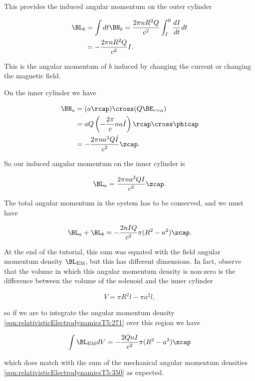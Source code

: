 This provides the induced angular momentum on the outer cylinder

\begin{align*}
\BL_b
&= \int dt \BN_b = \frac{ 2 \pi n R^2 Q}{c^2} \int_I^0 \frac{dI}{dt} dt \\
&= -\frac{2 \pi n R^2 Q}{c^2} I.
\end{align*}

This is the angular momentum of $b$ induced by changing the current or changing the magnetic field.

On the inner cylinder we have

\begin{align*}
\BN_a
&= (a \rcap ) \cross (Q \BE_{r = a}) \\
&= a Q \left(- \frac{2 \pi}{c} n a \dot{I} \right) \rcap \cross \phicap \\
&= -\frac{2 \pi n a^2 Q \dot{I}}{c^2} \zcap.
\end{align*}

So our induced angular momentum on the inner cylinder is

\begin{equation}\label{eqn:relativisticElectrodynamicsT5:330}
\BL_a = \frac{2 \pi n a^2 Q I}{c^2} \zcap.
\end{equation}

The total angular momentum in the system has to be conserved, and we must have

\begin{equation}\label{eqn:relativisticElectrodynamicsT5:350}
\BL_a + \BL_b = -\frac{2 n I Q}{c^2} \pi (R^2 - a^2) \zcap.
\end{equation}

At the end of the tutorial, this sum was equated with the field angular momentum density $\BL_{\text{EM}}$, but this has different dimensions.  In fact, observe that the volume in which this angular momentum density is non-zero is the difference between the volume of the solenoid and the inner cylinder

\begin{equation}\label{eqn:relativisticElectrodynamicsT5:351}
V = \pi R^2 l - \pi a^2 l,
\end{equation}

so if we are to integrate the angular momentum density \ref{eqn:relativisticElectrodynamicsT5:271} over this region we have

\begin{equation}\label{eqn:relativisticElectrodynamicsT5:271b}
\int \BL_{\text{EM}} dV = -\frac{2 Q n I}{c^2} \pi (R^2 - a^2) \zcap
\end{equation}

which does match with the sum of the mechanical angular momentum densities \ref{eqn:relativisticElectrodynamicsT5:350} as expected.

\EndArticle
